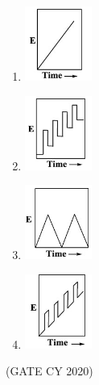 \documentclass[12pt]{article}
\begin{document}
\begin{enumerate}
\begin{enumerate}
\item \includegraphics[width=0.3\columnwidth]{figs/q40a.png}
    \label{fig:q40a}
\item \includegraphics[width=0.3\columnwidth]{figs/q40b.png}
    \label{fig:q40b}
\item \includegraphics[width=0.3\columnwidth]{figs/q40c.png}
    \label{fig:q40c}
\item \includegraphics[width=0.3\columnwidth]{figs/q40d.png}
    \label{fig:q40d}
\end{enumerate}
\hfill (GATE CY 2020)


\end{enumerate}
\end{document}
